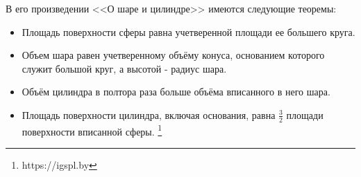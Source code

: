 \documentclass[14pt,a4paper]{report}
\begin{document}
В его произведении <<О шаре и цилиндре>> имеются следующие теоремы:
\begin{itemize}[noitemsep]
	\item Площадь поверхности сферы равна учетверенной площади ее большего круга.
	\item Объем шара равен учетверенному объёму конуса, основанием которого служит большой круг, а высотой - радиус шара.
	\item Объём цилиндра в полтора раза больше объёма вписанного в него шара.
	\item Площадь поверхности цилиндра, включая основания, равна $ \frac{3}{2} $ площади поверхности вписанной сферы. \footnote{https://igspl.by}
\end{itemize}




\end{document}
